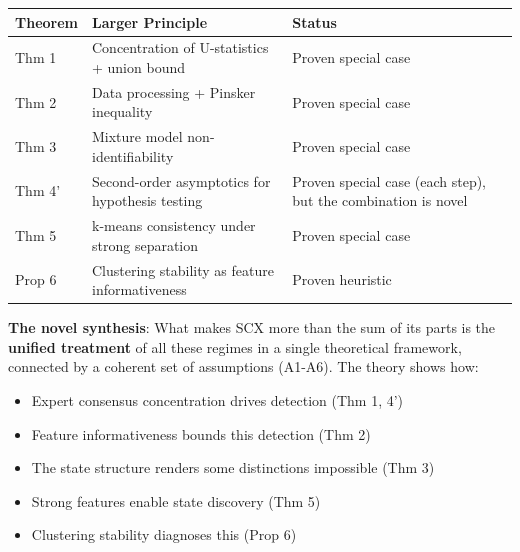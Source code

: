 \documentclass[
  12pt,
]{article}
\providecommand{\tightlist}{%
  \setlength{\itemsep}{0pt}\setlength{\parskip}{0pt}}
\begin{document}
\begin{longtable}[]{@{}
  >{\raggedright\arraybackslash}p{}
  >{\raggedright\arraybackslash}p{}
  >{\raggedright\arraybackslash}p{}@{}}
\toprule\noalign{}
\begin{minipage}[b]{\linewidth}\raggedright
Theorem
\end{minipage} & \begin{minipage}[b]{\linewidth}\raggedright
Larger Principle
\end{minipage} & \begin{minipage}[b]{\linewidth}\raggedright
Status
\end{minipage} \\
\midrule\noalign{}
\endhead
\bottomrule\noalign{}
\endlastfoot
Thm 1 & Concentration of U-statistics + union bound & Proven special
case \\
Thm 2 & Data processing + Pinsker inequality & Proven special case \\
Thm 3 & Mixture model non-identifiability & Proven special case \\
Thm 4' & Second-order asymptotics for hypothesis testing & Proven
special case (each step), but the combination is novel \\
Thm 5 & k-means consistency under strong separation & Proven special
case \\
Prop 6 & Clustering stability as feature informativeness & Proven
heuristic \\
\end{longtable}

\textbf{The novel synthesis}: What makes SCX more than the sum of its
parts is the \textbf{unified treatment} of all these regimes in a single
theoretical framework, connected by a coherent set of assumptions
(A1-A6). The theory shows how:

\begin{itemize}
\tightlist
\item
  Expert consensus concentration drives detection (Thm 1, 4')
\item
  Feature informativeness bounds this detection (Thm 2)
\item
  The state structure renders some distinctions impossible (Thm 3)
\item
  Strong features enable state discovery (Thm 5)
\item
  Clustering stability diagnoses this (Prop 6)
\end{itemize}
\end{document}
